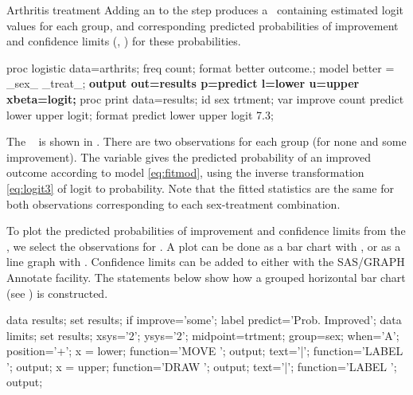 \begin{Example}[arthrit9]{Arthritis treatment}
Adding an  to the  step produces a \Dset\ containing estimated
logit values for each group, and corresponding predicted
probabilities of improvement and confidence limits (, ) for these probabilities.

\begin{listing}
proc logistic data=arthrits;
   freq count;
   format better outcome.;
   model better = _sex_ _treat_;
   \textbf{output out=results p=predict l=lower u=upper xbeta=logit;}
proc print data=results;
   id sex trtment; var improve count predict lower upper logit;
   format predict lower upper logit 7.3;
\end{listing}
The \ODS\  is shown in .
There are two observations for each group (for none and some
improvement).  The  variable gives the predicted
probability of an improved outcome according to model \eqref{eq:fitmod}, using the
inverse transformation \eqref{eq:logit3} of logit to probability.
Note that the fitted statistics are the same for both observations
corresponding to each sex-treatment combination.
\begin{Output}[htb]
\caption{Arthritis treatment data:  \Dset}\label{out:glogist0.3}
\small

\end{Output}

To plot the predicted probabilities of improvement and confidence
limits from the  \Dset, we select the observations
for .  A plot can be done as a bar chart with ,
or as a line graph with .  Confidence limits can be
added to either with the SAS/GRAPH Annotate facility.  The statements
below show how a grouped horizontal bar chart (see )
is constructed.
\begin{listing}
data results;
   set results;
   if improve='some';
   label predict='Prob. Improved';
data limits;
   set results;
   xsys='2'; ysys='2';
   midpoint=trtment;
   group=sex; when='A'; position='+';
   x = lower;  function='MOVE   '; output;
   text='|';   function='LABEL  '; output;
   x = upper;  function='DRAW   '; output;
   text='|';   function='LABEL  '; output;


\end{listing}
\end{Example}
